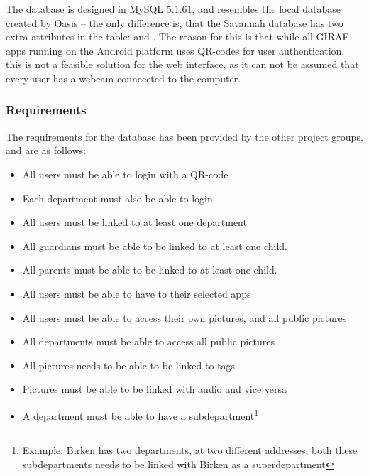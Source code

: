 The database is designed in MySQL 5.1.61, and resembles the local database created by Oasis -- the only difference is, that the Savannah database has two extra attributes in the  table:  and . The reason for this is that while all GIRAF apps running on the Android platform uses QR-codes for user authentication, this is not a feasible solution for the web interface, as it can not be assumed that every user has a webcam conneceted to the computer.

\subsubsection{Requirements}
\label{subsec:databaseReq}
The requirements for the database has been provided by the other project groups, and are as follows:

\begin{itemize} %
	\item All users must be able to login with a QR-code
	\item Each department must also be able to login
	\item All users must be linked to at least one department
	\item All guardians must be able to be linked to at least one child.
	\item All parents must be able to be linked to at least one child.
	\item All users must be able to have to their selected apps
	\item All users must be able to access their own pictures, and all public pictures
	\item All departments must be able to access all public pictures
	\item All pictures needs to be able to be linked to tags
	\item Pictures must be able to be linked with audio and vice versa
	\item A department must be able to have a subdepartment\footnote{Example: Birken has two departments, at two different addresses, both these subdepartments needs to be linked with Birken as a superdepartment}
\end{itemize}

